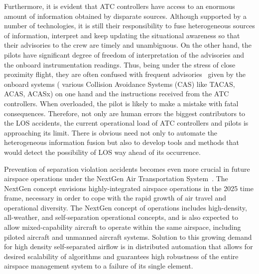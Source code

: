 \documentclass[letter,onecolumn,12pt]{aiaa-tc}
\newcommand{\1}{1_n}
\begin{document}
Furthermore, it is evident that ATC controllers have access to an enormous amount of information obtained by disparate sources. Although supported by a number of technologies, it is still their responsibility to fuse heterogeneous sources of information, interpret and keep updating the situational awareness so that their advisories to the crew are timely and unambiguous. On the other hand, the pilots have significant degree of freedom of interpretation of the advisories and the onboard instrumentation readings. Thus, being under the stress of close proximity flight, they are often confused with frequent advisories~\cite{Kochenderfer_2012} given by the onboard systems ( various Collision Avoidance Systems (CAS) like TACAS, ACAS, ACASx) on one hand and the instructions received from the ATC controllers. When overloaded, the pilot is likely to make a mistake with fatal consequences. Therefore, not only are human errors the biggest contributors to the LOS accidents, the current operational load of ATC controllers and pilots is approaching its limit. There is obvious need not only to automate the heterogeneous information fusion but also to develop tools and methods that would detect the possibility of LOS way ahead of its occurrence.


Prevention of separation violation accidents becomes even more crucial in future airspace operations under the NextGen Air Transportation  System~\cite{NextGen_ConOps}. The NextGen concept envisions highly-integrated airspace operations in the 2025 time frame, necessary in order to cope with the rapid growth of air travel and operational diversity. The NextGen concept of operations includes high-density, all-weather, and self-separation operational concepts, and is also expected to allow mixed-capability aircraft to operate within the same airspace, including piloted aircraft and unmanned aircraft systems. Solution to this growing demand for high density self-separated airflow is in distributed automation that allows for desired scalability of algorithms and guarantees high robustness of the entire airspace management system to a failure of its single element.
\end{document}

